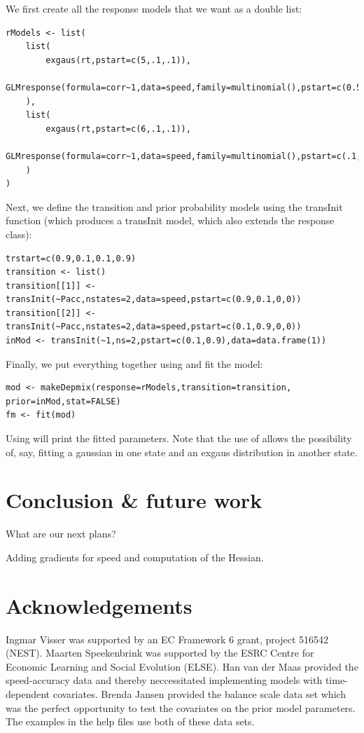 \documentclass[article]{jss}
\begin{document}
We first create all the response models that we want as a double list: 
\begin{verbatim}
rModels <- list(
	list(
		exgaus(rt,pstart=c(5,.1,.1)),
		GLMresponse(formula=corr~1,data=speed,family=multinomial(),pstart=c(0.5,0.5))
	),
	list(
		exgaus(rt,pstart=c(6,.1,.1)),
		GLMresponse(formula=corr~1,data=speed,family=multinomial(),pstart=c(.1,.9))
	)
)
\end{verbatim}
Next, we define the transition and prior probability models using the 
transInit function (which produces a transInit model, which also extends 
the response class): 
\begin{verbatim}
trstart=c(0.9,0.1,0.1,0.9)
transition <- list()
transition[[1]] <- transInit(~Pacc,nstates=2,data=speed,pstart=c(0.9,0.1,0,0))
transition[[2]] <- transInit(~Pacc,nstates=2,data=speed,pstart=c(0.1,0.9,0,0))
inMod <- transInit(~1,ns=2,pstart=c(0.1,0.9),data=data.frame(1))
\end{verbatim}
Finally, we put everything together using  and fit 
the model: 
\begin{verbatim}
mod <- makeDepmix(response=rModels,transition=transition,
prior=inMod,stat=FALSE)
fm <- fit(mod)
\end{verbatim}

Using  will print the fitted parameters. Note that the 
use of  allows the possibility of, say, fitting a 
gaussian in one state and an exgaus distribution in another state. 



\section[Conclusion and future work]{Conclusion \& future work}


What are our next plans?

Adding gradients for speed and computation of the Hessian. 


\section*{Acknowledgements} 

Ingmar Visser was supported by an EC Framework 6 grant, project 516542
(NEST).  Maarten Speekenbrink was supported by the ESRC Centre for
Economic Learning and Social Evolution (ELSE).  Han van der Maas
provided the speed-accuracy data \cite{Dutilh2009} and thereby
neccessitated implementing models with time-dependent covariates.
Brenda Jansen provided the balance scale data set \citep{Jansen2002}
which was the perfect opportunity to test the covariates on the prior
model parameters.  The examples in the help files use both of these
data sets.


\end{document}
